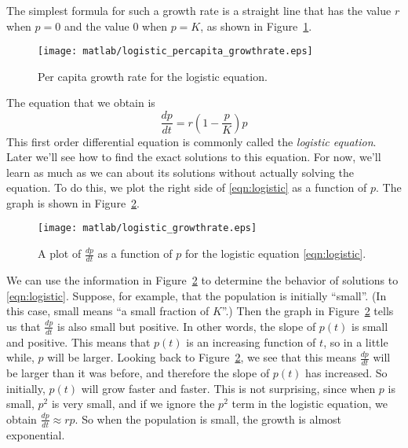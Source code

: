 \documentclass{book}
\begin{document}
The simplest formula for such a growth rate is a straight line that has
the value $r$ when $p=0$ and the value $0$ when $p=K$, as shown in
Figure~\ref{fig:growthrate}.
\begin{figure}
\centerline{\texttt{[image: matlab/logistic\_percapita\_growthrate.eps]}} 
\caption{Per capita growth rate for the logistic equation.}
\label{fig:growthrate}
\end{figure} 
The equation that we obtain is
\begin{equation}
  \frac{dp}{dt} = r\left(1-\frac{p}{K}\right)p
\label{eqn:logistic}
\end{equation}
This first order differential equation is commonly called the \emph{logistic equation}.
Later we'll see how to find the exact solutions to this equation.
For now, we'll learn as much as we can about its solutions without actually solving the
equation.  To do this, we plot the right side of \eqref{eqn:logistic} as a function of $p$.
The graph is shown in Figure~\ref{fig:logisticrhs}.
\begin{figure}
\centerline{\texttt{[image: matlab/logistic\_growthrate.eps]}} 
\caption{A plot of $\frac{dp}{dt}$ as a function of $p$ for the logistic
equation \eqref{eqn:logistic}.}
\label{fig:logisticrhs}
\end{figure}
We can use the information in Figure~\ref{fig:logisticrhs} to determine the
behavior of solutions to \eqref{eqn:logistic}.
Suppose, for example, that the population is initially ``small''.
(In this case, small means ``a small fraction of $K$''.)
Then the graph in Figure~\ref{fig:logisticrhs} tells us that
$\frac{dp}{dt}$ is also small but positive.  In other words, the slope
of $p(t)$ is small and positive.  This means that $p(t)$ is an increasing
function of $t$, so in a little while, $p$ will be larger.  Looking back to
Figure~\ref{fig:logisticrhs}, we see that this means $\frac{dp}{dt}$ will be
larger than it was before, and therefore the slope of $p(t)$ has increased.
So initially, $p(t)$ will grow faster and faster.  This is not surprising, since
when $p$ is small, $p^2$ is very small, and if we ignore the $p^2$ term in the
logistic equation, we obtain $\frac{dp}{dt} \approx rp$.  So when the
population is small, the growth is almost exponential.
\end{document}
